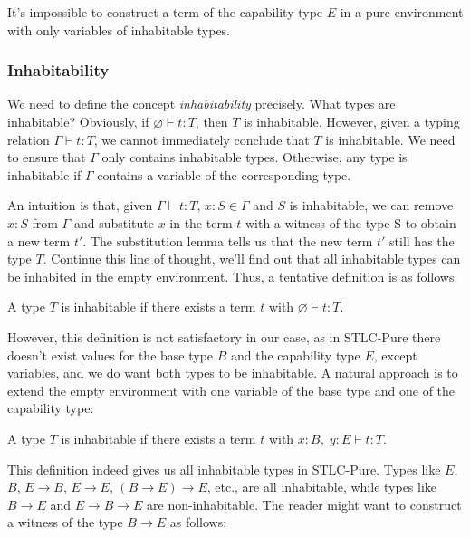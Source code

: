 \begin{definition}
  It's impossible to construct a term of the capability type $E$ in a
  pure environment with only variables of inhabitable types.
\end{definition}

\subsubsection{Inhabitability}

We need to define the concept \emph{inhabitability} precisely. What
types are inhabitable? Obviously, if $\varnothing \vdash t: T$, then
$T$ is inhabitable.  However, given a typing relation
$\Gamma \vdash t: T$, we cannot immediately conclude that $T$ is
inhabitable. We need to ensure that $\Gamma$ only contains inhabitable
types. Otherwise, any type is inhabitable if $\Gamma$ contains a
variable of the corresponding type.

An intuition is that, given $\Gamma \vdash t: T$, $x:S \in \Gamma$ and
$S$ is inhabitable, we can remove $x:S$ from $\Gamma$ and substitute
$x$ in the term $t$ with a witness of the type S to obtain a new term
$t'$. The substitution lemma tells us that the new term $t'$ still has
the type $T$. Continue this line of thought, we'll find out that all
inhabitable types can be inhabited in the empty environment. Thus, a
tentative definition is as follows:

\begin{definition}
  A type $T$ is inhabitable if there exists a term $t$ with
  $\varnothing \vdash t : T$.
\end{definition}

However, this definition is not satisfactory in our case, as in
STLC-Pure there doesn't exist values for the base type $B$ and the
capability type $E$, except variables, and we do want both types to be
inhabitable. A natural approach is to extend the empty environment
with one variable of the base type and one of the capability type:

\begin{definition}
  A type $T$ is inhabitable if there exists a term $t$ with
  $x:B,\; y:E \vdash t : T$.
\end{definition}

This definition indeed gives us all inhabitable types in
STLC-Pure. Types like $E$, $B$, $E \to B$, $E \to E$,
$(B \to E) \to E$, etc., are all inhabitable, while types like
$B \to E$ and $E \to B \to E$ are non-inhabitable. The reader might
want to construct a witness of the type $B \to E$ as follows:

